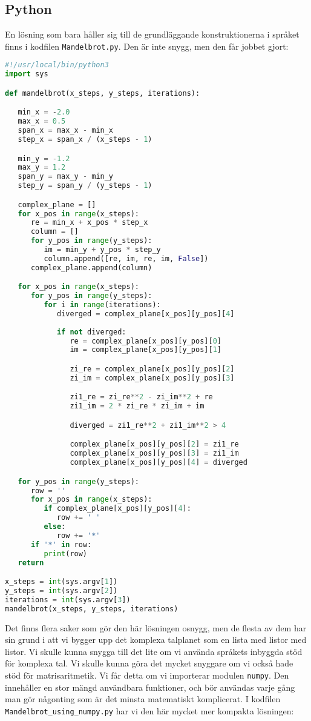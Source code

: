 \documentclass[10pt, twoside,a4paper]{article}
\begin{document}
\newpage
\subsection{Python}
En lösning som bara håller sig till de grundläggande konstruktionerna i språket finns i kodfilen \verb+Mandelbrot.py+. Den är inte snygg, men den får jobbet gjort:
\begin{lstlisting}[language=python]
#!/usr/local/bin/python3
import sys

def mandelbrot(x_steps, y_steps, iterations):

   min_x = -2.0
   max_x = 0.5
   span_x = max_x - min_x
   step_x = span_x / (x_steps - 1)

   min_y = -1.2
   max_y = 1.2
   span_y = max_y - min_y
   step_y = span_y / (y_steps - 1)

   complex_plane = []
   for x_pos in range(x_steps):
      re = min_x + x_pos * step_x
      column = []
      for y_pos in range(y_steps):
         im = min_y + y_pos * step_y
         column.append([re, im, re, im, False])
      complex_plane.append(column)

   for x_pos in range(x_steps):
      for y_pos in range(y_steps):
         for i in range(iterations):
            diverged = complex_plane[x_pos][y_pos][4]
            
            if not diverged:
               re = complex_plane[x_pos][y_pos][0]
               im = complex_plane[x_pos][y_pos][1]

               zi_re = complex_plane[x_pos][y_pos][2]
               zi_im = complex_plane[x_pos][y_pos][3]

               zi1_re = zi_re**2 - zi_im**2 + re
               zi1_im = 2 * zi_re * zi_im + im

               diverged = zi1_re**2 + zi1_im**2 > 4

               complex_plane[x_pos][y_pos][2] = zi1_re
               complex_plane[x_pos][y_pos][3] = zi1_im
               complex_plane[x_pos][y_pos][4] = diverged

   for y_pos in range(y_steps):
      row = ''
      for x_pos in range(x_steps):
         if complex_plane[x_pos][y_pos][4]:
            row += ' '
         else:
            row += '*'
      if '*' in row:
         print(row)
   return

x_steps = int(sys.argv[1])
y_steps = int(sys.argv[2])
iterations = int(sys.argv[3])
mandelbrot(x_steps, y_steps, iterations)
\end{lstlisting}
Det finns flera saker som gör den här lösningen osnygg, men de flesta av dem har sin grund i att vi bygger upp det komplexa talplanet som en lista med listor med listor. Vi skulle kunna snygga till det lite om vi använda språkets inbyggda stöd för komplexa tal. Vi skulle kunna göra det mycket snyggare om vi också hade stöd för matrisaritmetik. Vi får detta om vi importerar modulen \verb+numpy+. Den innehåller en stor mängd användbara funktioner, och bör användas varje gång man gör någonting som är det minsta matematiskt komplicerat. I kodfilen \verb+Mandelbrot_using_numpy.py+ har vi den här mycket mer kompakta lösningen:
\end{document}
